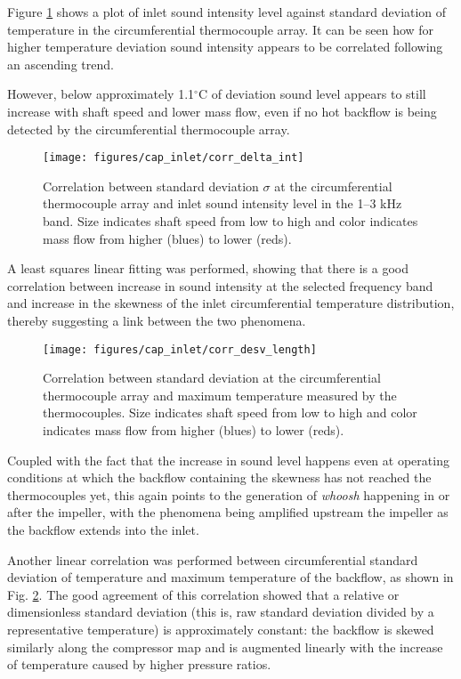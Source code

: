 Figure \ref{fig:corr1} shows a plot of inlet sound intensity level against standard deviation of temperature in the circumferential thermocouple array. It can be seen how for higher temperature deviation sound intensity appears to be correlated following an ascending trend.

However, below approximately 1.1$^{\circ}$C of deviation sound level appears to still increase with shaft speed and lower mass flow, even if no hot backflow is being detected by the circumferential thermocouple array.

\begin{figure}[htb!]
\centering
\texttt{[image: figures/cap\_inlet/corr\_delta\_int]}
\caption{Correlation between standard deviation $\sigma$ at the circumferential thermocouple array and inlet sound intensity level in the 1--3 kHz band. Size indicates shaft speed from low to high and color indicates mass flow from higher (blues) to lower (reds).}
\label{fig:corr1}
\end{figure}

A least squares linear fitting was performed, showing that there is a good correlation between increase in sound intensity at the selected frequency band and increase in the skewness of the inlet circumferential temperature distribution, thereby suggesting a link between the two phenomena.

\begin{figure}[htb!]
\centering
\texttt{[image: figures/cap\_inlet/corr\_desv\_length]}
\caption{Correlation between standard deviation at the circumferential thermocouple array and maximum temperature measured by the thermocouples. Size indicates shaft speed from low to high and color indicates mass flow from higher (blues) to lower (reds).}
\label{fig:corr2}
\end{figure}

Coupled with the fact that the increase in sound level happens even at operating conditions at which the backflow containing the skewness has not reached the thermocouples yet, this again points to the generation of \emph{whoosh} happening in or after the impeller, with the phenomena being amplified upstream the impeller as the backflow extends into the inlet.

Another linear correlation was performed between circumferential standard deviation of temperature and maximum temperature of the backflow, as shown in Fig. \ref{fig:corr2}. The good agreement of this correlation showed that a relative or dimensionless standard deviation (this is, raw standard deviation divided by a representative temperature) is approximately constant: the backflow is skewed similarly along the compressor map and is augmented linearly with the increase of temperature caused by higher pressure ratios.

